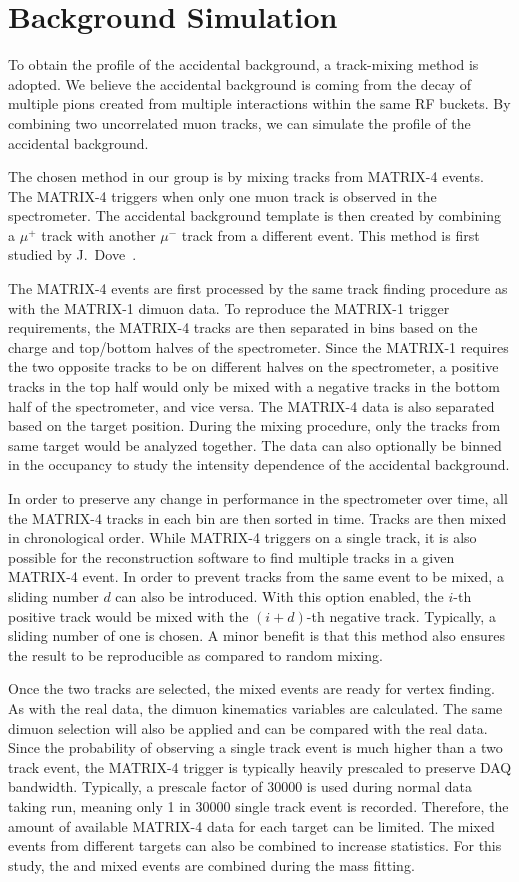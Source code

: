 \documentclass[../main.tex]{subfiles}
\begin{document}
\section{Background Simulation}
\label{sec:mixing}
To obtain the profile of the accidental background, a track-mixing method is adopted.
We believe the accidental background is coming from the decay of multiple pions created from multiple interactions
within the same RF buckets. By combining two uncorrelated muon tracks, we can simulate the profile
of the accidental background.

The chosen method in our group is by mixing tracks from MATRIX-4 events. The MATRIX-4 triggers when
only one muon track is observed in the spectrometer.
The accidental background template is then created by combining a $\mu^+$ track with
another $\mu^-$ track from a different event. This method is first studied by
J.~Dove~\cite{dove2020}.

The MATRIX-4 events are first processed by the same track finding procedure as with
the MATRIX-1 dimuon data.
To reproduce the MATRIX-1 trigger requirements, the MATRIX-4 tracks are then separated in bins
based on the charge and top/bottom halves of the spectrometer. Since the MATRIX-1
requires the two opposite tracks to be on different halves on the spectrometer,
a positive tracks in the top half would only be mixed with a negative tracks in the
bottom half of the spectrometer, and vice versa. The MATRIX-4 data is also separated
based on the target position. During the mixing procedure, only the tracks from same
target would be analyzed together.
The data can also optionally be binned in the occupancy to study the intensity dependence
of the accidental background.

In order to preserve any change in performance in the spectrometer over time, all the
MATRIX-4 tracks in each bin are then sorted in time. Tracks are then mixed in chronological order.
While MATRIX-4 triggers on a single track, it is also
possible for the reconstruction software to find multiple tracks in a given MATRIX-4 event.
In order to prevent tracks from the same event to be mixed, a sliding number $d$ can also be introduced.
With this option enabled, the $i$-th positive track would be mixed with the $\left(i+d\right)$-th negative track.
Typically, a sliding number of one is chosen.
A minor benefit is that this method also ensures the result to be reproducible as compared to random
mixing.

Once the two tracks are selected, the mixed events are ready for vertex finding. As with the
real data, the dimuon kinematics variables are calculated. The same dimuon selection will
also be applied and can be compared with the real data. Since the probability of observing a
single track event is much higher than a two track event, the MATRIX-4 trigger is typically
heavily prescaled to preserve DAQ bandwidth. Typically, a prescale factor of \num{30000} is used during
normal data taking run, meaning only \num{1} in \num{30000} single track event is recorded.
Therefore, the amount of available MATRIX-4 data for each target can be limited. The mixed events
from different targets can also be combined to increase statistics. For this study, the 
and  mixed events are combined during the mass fitting.
\end{document}
